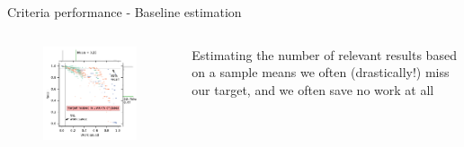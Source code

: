 \documentclass[9pt, aspectratio=169]{beamer}
\begin{document}
\begin{frame}{Criteria performance - Baseline estimation}

\begin{columns}
	\begin{column}{0.5\linewidth}
		\begin{figure}
			\includegraphics[width=\linewidth]{../manuscript/2_figs_jointplot_bir.pdf}
		\end{figure}
	\end{column}
	\begin{column}{0.5\linewidth}
Estimating the number of relevant results based on a sample means we often (drastically!) miss our target, and we often save no work at all
		
	\end{column}
\end{columns}

\end{frame}
\end{document}
